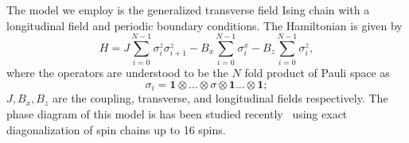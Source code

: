 The model we employ is the generalized transverse field Ising chain with a 
longitudinal field and periodic boundary conditions. The Hamiltonian 
is given by
\begin{equation}
	H = J \sum_{i=0}^{N-1} \sigma_i^z \sigma_{i+1}^z - B_x \sum_{i=0}^{N-1}
	\sigma_i^x  - B_z \sum_{i=0}^{N-1} \sigma_i^z,
\end{equation}
where the operators are understood to be the $N$ fold product of Pauli space as
\begin{equation}
	\sigma_i = \mathbf{1} \otimes ... \otimes \sigma \otimes \mathbf{1} ...
	\otimes \mathbf{1};
\end{equation}
$J, B_x, B_z$ are the coupling, transverse, and longitudinal fields
respectively.  The phase diagram of this model is has been studied
recently~\cite{bonfim2019} using exact diagonalization of spin chains up to 16
spins. 
